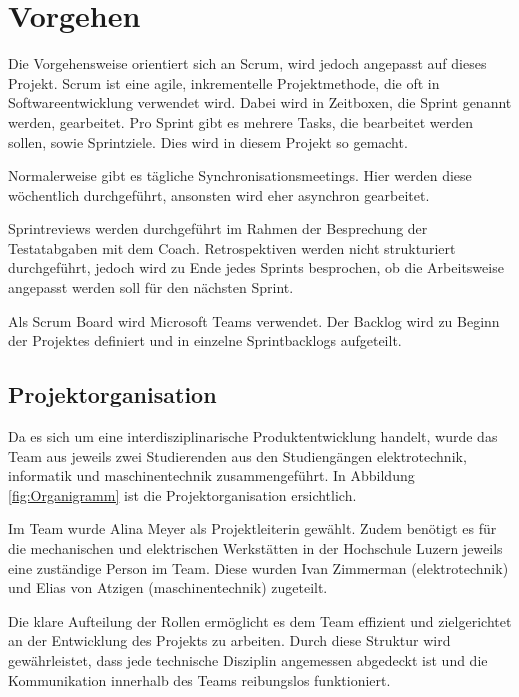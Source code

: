 \section{Vorgehen}

Die Vorgehensweise orientiert sich an Scrum, wird jedoch angepasst auf dieses Projekt.
Scrum ist eine agile, inkrementelle Projektmethode, die oft in Softwareentwicklung verwendet wird. Dabei wird in Zeitboxen, die Sprint genannt werden, gearbeitet. Pro Sprint gibt es mehrere Tasks, die bearbeitet werden sollen, sowie Sprintziele. Dies wird in diesem Projekt so gemacht.\cite{wikipedia-scrum}

Normalerweise gibt es tägliche Synchronisationsmeetings. Hier werden diese wöchentlich durchgeführt, ansonsten wird eher asynchron gearbeitet.

Sprintreviews werden durchgeführt im Rahmen der Besprechung der Testatabgaben mit dem Coach. Retrospektiven werden nicht strukturiert durchgeführt, jedoch wird zu Ende jedes Sprints besprochen, ob die Arbeitsweise angepasst werden soll für den nächsten Sprint.

Als Scrum Board wird Microsoft Teams verwendet. Der Backlog wird zu Beginn der Projektes definiert und in einzelne Sprintbacklogs aufgeteilt.

\subsection{Projektorganisation}

Da es sich um eine interdisziplinarische Produktentwicklung handelt, wurde das Team aus jeweils zwei Studierenden aus den Studiengängen \acrfull{elektrotechnik}, \acrfull{informatik} und \acrfull{maschinentechnik} zusammengeführt. In Abbildung \ref{fig:Organigramm} ist die Projektorganisation ersichtlich. 

Im Team wurde Alina Meyer als Projektleiterin gewählt. Zudem benötigt es für die mechanischen und elektrischen Werkstätten in der Hochschule Luzern jeweils eine zuständige Person im Team. Diese wurden Ivan Zimmerman (\acrshort{elektrotechnik}) und Elias von Atzigen (\acrshort{maschinentechnik}) zugeteilt.

Die klare Aufteilung der Rollen ermöglicht es dem Team effizient und zielgerichtet an der Entwicklung des Projekts zu arbeiten. Durch diese Struktur wird gewährleistet, dass jede technische Disziplin angemessen abgedeckt ist und die Kommunikation innerhalb des Teams reibungslos funktioniert.

